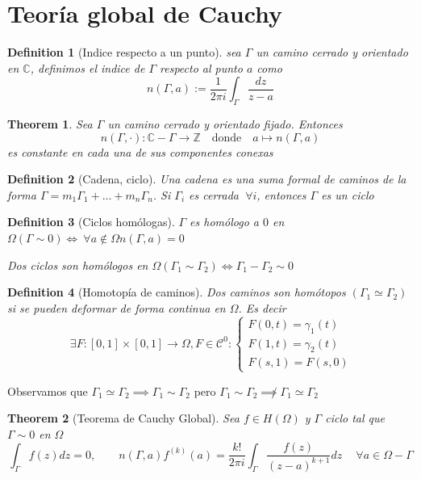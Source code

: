 \documentclass{myclass}
\newtheorem*{definition}{Definition}
\newtheorem*{theorem}{Theorem}
\begin{document}
\section{Teoría global de Cauchy}
\begin{definition}[Indice respecto a un punto] sea $\Gamma$ un camino cerrado y orientado en $\mathbb{C}$, definimos el indice de $\Gamma$ respecto al punto $a$ como
  \[
  n(\Gamma, a) := \frac{1}{2\pi i} \int_{\Gamma} \frac{dz}{z-a}
  \] 
\end{definition}

\begin{theorem}
Sea $\Gamma$ un camino cerrado y orientado fijado. Entonces
\[
n(\Gamma, \cdot): \mathbb{C}-\Gamma \to \mathbb{Z} \quad \text{donde}  \quad a \mapsto n(\Gamma, a)
\] 
es constante en cada una de sus componentes conexas
\end{theorem}

\begin{definition}[Cadena, ciclo]
Una cadena es una suma formal de caminos de la forma $\Gamma = m_1\Gamma_1 + \ldots + m_n\Gamma_n$. Si $\Gamma_i$ es cerrada $\ \forall i$, entonces $\Gamma$ es un ciclo
\end{definition}

\begin{definition}[Ciclos homólogas]
$\Gamma$ es homólogo a $0$ en $\Omega (\Gamma \sim 0) \iff \ \forall a \not\in \Omega n(\Gamma, a) = 0$ 

Dos ciclos son homólogos en $\Omega (\Gamma_1 \sim \Gamma_2) \iff \Gamma_1-\Gamma_2 \sim 0$ 
\end{definition}

\begin{definition}[Homotopía de caminos]
Dos caminos son homótopos $(\Gamma_1 \simeq \Gamma_2)$ si se pueden deformar de forma continua en $\Omega$. Es decir
\[
\ \exists F: [0, 1]\times [0, 1] \to \Omega, F\in \mathcal{C}^0 : \begin{cases}
  F(0, t) = \gamma_1(t) \\
  F(1, t) = \gamma_2(t) \\
  F(s, 1) = F(s, 0)
\end{cases}
\] 
\end{definition}

Observamos que $\Gamma_1 \simeq \Gamma_2 \implies \Gamma_1 \sim \Gamma_2$ pero $\Gamma_1 \sim \Gamma_2 \not\implies \Gamma_1 \simeq \Gamma_2$


\begin{theorem}[Teorema de Cauchy Global]
Sea $f\in H(\Omega)$ y $\Gamma$ ciclo tal que $\Gamma \sim 0$ en $\Omega$
\[
\int_\Gamma f(z)dz = 0, \qquad n(\Gamma, a)f^{(k)}(a) = \frac{k!}{2\pi i}\int_\Gamma \frac{f(z)}{(z-a)^{k+1}}dz  \quad \ \forall a\in \Omega-\Gamma
\] 
\end{theorem}
\end{document}
